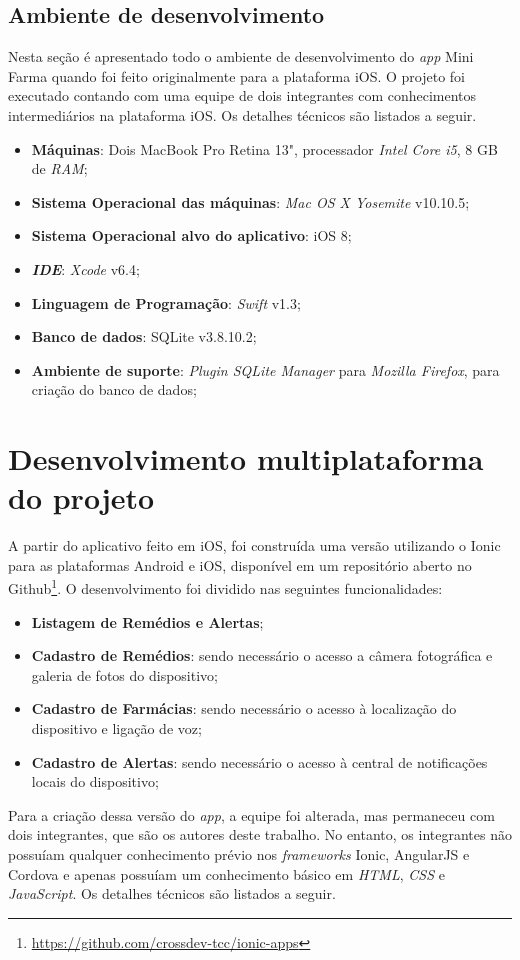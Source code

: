 \subsection{Ambiente de desenvolvimento} \label{subsec:ambientedesenvolvimento}
Nesta seção é apresentado todo o ambiente de desenvolvimento do \textit{app} Mini Farma quando foi feito originalmente para a plataforma iOS. 
O projeto foi executado contando com uma equipe de dois integrantes com conhecimentos intermediários na plataforma iOS. 
Os detalhes técnicos são listados a seguir.
\begin{itemize}
    \item \textbf{Máquinas}: Dois MacBook Pro Retina 13", processador \textit{Intel Core i5}, 8 GB de \textit{RAM};
    \item \textbf{Sistema Operacional das máquinas}: \textit{Mac OS X Yosemite} v10.10.5;
    \item \textbf{Sistema Operacional alvo do aplicativo}: iOS 8;
    \item \textbf{\textit{IDE}}: \textit{Xcode} v6.4;
    \item \textbf{Linguagem de Programação}: \textit{Swift} v1.3;
    \item \textbf{Banco de dados}: SQLite v3.8.10.2;
    \item \textbf{Ambiente de suporte}: \textit{Plugin SQLite Manager} para \textit{Mozilla Firefox}, para criação do banco de dados;
\end{itemize}

\section{Desenvolvimento multiplataforma do projeto} \label{sec:desenvolvimentomulti}

A partir do aplicativo feito em iOS, foi construída uma versão utilizando o Ionic para as plataformas Android e iOS, 
disponível em um repositório aberto no Github\footnote{\url{https://github.com/crossdev-tcc/ionic-apps}}. O desenvolvimento foi dividido nas seguintes funcionalidades:
\begin{itemize}
	\item \textbf{Listagem de Remédios e Alertas};
	\item \textbf{Cadastro de Remédios}: sendo necessário o acesso a câmera fotográfica e galeria de fotos do dispositivo;
	\item \textbf{Cadastro de Farmácias}: sendo necessário o acesso à localização do dispositivo e ligação de voz;
	\item \textbf{Cadastro de Alertas}: sendo necessário o acesso à central de notificações locais do dispositivo;
\end{itemize}
Para a criação dessa versão do \textit{app}, a equipe foi alterada, mas permaneceu com dois integrantes, que são os autores deste trabalho.
No entanto, os integrantes não possuíam qualquer conhecimento prévio nos \textit{frameworks} Ionic, AngularJS e Cordova
e apenas possuíam um conhecimento básico em \textit{HTML}, \textit{CSS} e \textit{JavaScript}. Os detalhes técnicos são listados a seguir.
   

